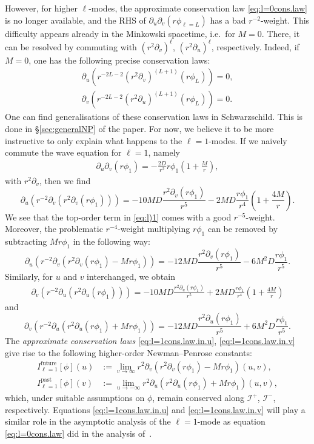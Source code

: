 \documentclass[11pt,english]{article}
\numberwithin{equation}{section}
\theoremstyle{remark}
\theoremstyle{plain}
\theoremstyle{remark}
\newcommand{\pu}{\partial_u}
\newcommand{\pv}{\partial_v}
\renewcommand{\(}{\left(}
\renewcommand{\)}{\right)}
\newcommand{\ILn}[1]{I_{\ell=#1}^{\mathrm{future}}}
\newcommand{\ILpn}[1]{I_{\ell=#1}^{\mathrm{past}}}
\begin{document}
However, for higher $\ell$-modes, the approximate conservation law \eqref{eq:l=0cons.law} is no longer available, and the RHS of $\pu\pv(r\phi_{\ell=L})$ has a bad $r^{-2}$-weight. This difficulty appears already in the Minkowski spacetime, i.e.\ for $M=0$. There, it can be resolved by commuting with $(r^2\pv)^\ell$, $(r^2\pu)^\ell$, respectively. Indeed, if $ M=0$, one has the following precise conservation laws:
\begin{align*}
\pu(r^{-2L-2}(r^2\pv)^{(L+1)}(r\phi_L))=0,\\
\pv(r^{-2L-2}(r^2\pu)^{(L+1)}(r\phi_L))=0.
\end{align*}
One can find generalisations of these conservation laws in Schwarzschild. This is done in \S \ref{sec:generalNP} of the paper. For now, we believe it to be more instructive to only explain what happens to the $\ell=1$-modes.
If we naively commute the wave equation for $\ell =1$, namely
\begin{align}\label{eq:l=1waveequation}
\pu\pv(r\phi_1)=-\frac{2D}{r^2}r\phi_1\left(1+\frac{M}{r}\right),
\end{align}
with $r^2\pv$, then we find
\begin{equation}\label{eq:l)1}
\pu(r^{-2}\pv(r^2\pv(r\phi_1)))=-10 MD\frac{r^2\pv(r\phi_1)}{r^5}-2MD\frac{r\phi_1}{r^4}\left(1+\frac{4M}{r}\right).
\end{equation}
We see that the top-order term in \eqref{eq:l)1} comes with a good $r^{-5}$-weight. Moreover, the problematic $r^{-4}$-weight multiplying $r\phi_1$ can be removed by subtracting $Mr\phi_1$ in the following way:
\begin{equation}\label{eq:l=1cons.law.in.u}
\pu(r^{-2}\pv(r^2\pv(r\phi_1)-M r\phi_1))=-12 MD\frac{r^2\pv(r\phi_1)}{r^5}-6M^2 D\frac{r\phi_1}{r^5}.
\end{equation}
Similarly, for $u$ and $v$ interchanged, we obtain
\begin{align}
\pv(r^{-2}\pu(r^2\pu(r\phi_1)))=-10 MD\frac{r^2\pu(r\phi_1)}{r^5}+2MD\frac{r\phi_1}{r^4}\left(1+\frac{4M}{r}\right)
\end{align}
and 
\begin{equation}\label{eq:l=1cons.law.in.v}
\pv(r^{-2}\pu(r^2\pu(r\phi_1)+M r\phi_1))=-12 MD\frac{r^2\pu(r\phi_1)}{r^5}+6M^2 D\frac{r\phi_1}{r^5}.
\end{equation}
The \textit{approximate conservation laws} \eqref{eq:l=1cons.law.in.u}, \eqref{eq:l=1cons.law.in.v} give rise to the following higher-order Newman--Penrose constants:
\begin{align}\label{eq:NPl=1future}
\ILn1[\phi](u)&:=\lim_{v\to\infty}r^2\pv(r^2\pv(r\phi_1)-Mr\phi_1)(u,v),\\
\ILpn1[\phi](v)&:=\lim_{u\to-\infty}r^2\pu(r^2\pu (r\phi_1)+Mr\phi_1)(u,v),
\end{align}
which, under suitable assumptions on $\phi$, remain conserved along $\mathcal{I}^+$, $\mathcal{I}^-$, respectively.
Equations \eqref{eq:l=1cons.law.in.u} and \eqref{eq:l=1cons.law.in.v} will play a similar role in the asymptotic analysis of the $\ell=1$-mode as equation \eqref{eq:l=0cons.law} did in the analysis of~\cite{I}.
\end{document}
